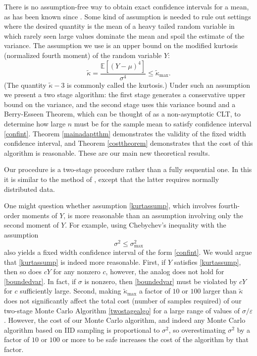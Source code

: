 \documentclass[graybox]{svmult}
\newcommand\e{\mathbb{E}}
\newcommand{\tkappa}{\tilde{\kappa}}
\begin{document}
There is no assumption-free way to obtain exact confidence intervals for a mean,
as has been known since \cite{BahSav56}. Some kind of assumption is needed to rule out settings where the desired quantity is the
mean of a heavy tailed random variable in which
rarely seen large values dominate the mean and spoil the estimate of the variance.
The assumption we use is an upper bound on
the modified kurtosis (normalized fourth moment) of the
random variable $Y$:
\begin{equation} \label{kurtassump}
\tkappa = \frac{\e[(Y-\mu)^4]}{\sigma^4} \le \tkappa_{\max}.
\end{equation}
(The quantity $\tkappa-3$ is commonly called the kurtosis.)  Under such an assumption we present
a two stage algorithm: the first stage generates
a conservative upper bound on the variance, and the second stage
uses this variance bound and a Berry-Esseen Theorem, which can be thought of as a non-asymptotic CLT, to determine how large $n$ must be for the sample mean to satisfy confidence interval \eqref{confint}.  Theorem \ref{mainadaptthm} demonstrates the validity of the fixed width confidence interval, and Theorem \ref{costtheorem} demonstrates that the cost of this algorithm is reasonable.  These are our main new theoretical results.

Our procedure is a two-stage procedure
rather than a fully sequential one.  In
this it is similar to the method of
\cite{Stei1945a,Stei1949a}, except that
the latter requires normally distributed
data.

One might question whether assumption \eqref{kurtassump}, which involves fourth-order moments of $Y$, is more reasonable than an assumption involving only the second moment of $Y$.  For example, using Chebychev's inequality with the assumption 
\begin{equation} \label{boundedvar}
\sigma^2 \le \sigma^2_{\max}
\end{equation}
also yields a fixed width confidence interval of the form \eqref{confint}.  We would argue that \eqref{kurtassump} is indeed more reasonable.  First, if $Y$ satisfies \eqref{kurtassump}, then so does $cY$ for any nonzero $c$, however, the analog does not hold for \eqref{boundedvar}.  In fact, if $\sigma$ is nonzero, then \eqref{boundedvar} must be violated by $cY$ for $c$ sufficiently large.  Second, making $\tkappa_{\max}$ a factor of $10$ or $100$ larger than $\tkappa$ does not significantly affect the total cost (number of samples required) of our two-stage Monte Carlo Algorithm \ref{twostagealgo} for a large range of values of $\sigma/\varepsilon$.  However, the cost of our Monte Carlo algorithm, and indeed any Monte Carlo algorithm based on IID sampling is proportional to $\sigma^2$, so overestimating $\sigma^2$ by a factor of $10$ or $100$ or more to be safe increases the cost of the algorithm by that factor. 
\end{document}
